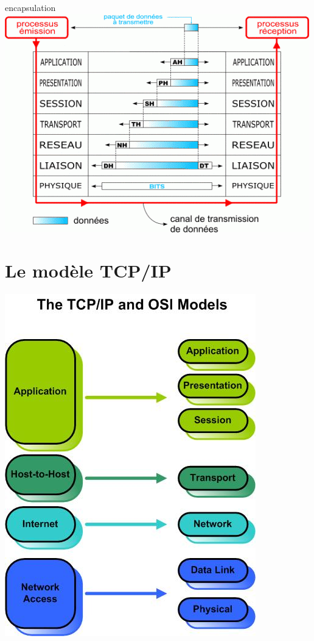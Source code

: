 \documentclass{beamer}
\begin{document}
	\begin{frame}{encapsulation}
		\includegraphics[scale = 0.65]{Encaps.png}\\
	\end{frame}

\section{Le modèle TCP/IP}

	\begin{frame}
		\begin{center}
			\includegraphics[scale = 0.55]{TCPIP.png}\\
		\end{center}
	\end{frame}
\end{document}
